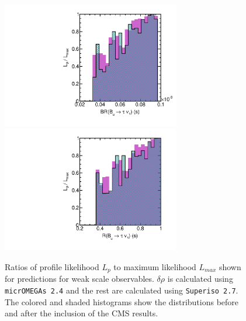 \begin{figure}[htbp]
\begin{center}
\includegraphics[height=5.5cm]{figs/fig_Btaunu_s.pdf} 
\includegraphics[height=5.5cm]{figs/fig_RBtaunu_s.pdf} 
\caption{Ratios of profile likelihood $L_p$ to maximum likelihood $L_{max}$ shown for predictions for weak scale observables.  $\delta\rho$ is calculated using {\tt micrOMEGAs 2.4} and the rest are calculated using {\tt Superiso 2.7}.  The colored and shaded histograms show the distributions before and after the inclusion of the CMS results.}
\label{fig:LRwcms_EWobs_s1}
\end{center}
\end{figure}


